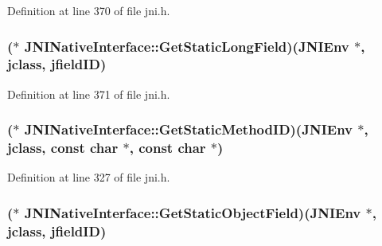 Definition at line 370 of file jni.\-h.

\hypertarget{struct_j_n_i_native_interface_ad18f74a717b723ccfa01bb14e7ef1c44}{
\subsubsection[{Get\-Static\-Long\-Field}]{($\ast$ J\-N\-I\-Native\-Interface\-::\-Get\-Static\-Long\-Field)({\bf J\-N\-I\-Env} $\ast$, {\bf jclass}, {\bf jfield\-I\-D})}}\label{struct_j_n_i_native_interface_ad18f74a717b723ccfa01bb14e7ef1c44}


Definition at line 371 of file jni.\-h.

\hypertarget{struct_j_n_i_native_interface_a33e9da518ef7d9dc93c86b829be93c9f}{
\subsubsection[{Get\-Static\-Method\-I\-D}]{($\ast$ J\-N\-I\-Native\-Interface\-::\-Get\-Static\-Method\-I\-D)({\bf J\-N\-I\-Env} $\ast$, {\bf jclass}, const char $\ast$, const char $\ast$)}}\label{struct_j_n_i_native_interface_a33e9da518ef7d9dc93c86b829be93c9f}


Definition at line 327 of file jni.\-h.

\hypertarget{struct_j_n_i_native_interface_ae221752a3f95d01e80ff37d246df808f}{
\subsubsection[{Get\-Static\-Object\-Field}]{($\ast$ J\-N\-I\-Native\-Interface\-::\-Get\-Static\-Object\-Field)({\bf J\-N\-I\-Env} $\ast$, {\bf jclass}, {\bf jfield\-I\-D})}}\label{struct_j_n_i_native_interface_ae221752a3f95d01e80ff37d246df808f}


